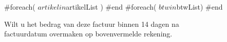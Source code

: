 \documentclass{factuur}
\begin{document}

\begin{particulierTable}[$Valuta]
	#foreach( $artikel in $artikelList )
	#end
	#foreach( $btw in $btwList)
	#end
\end{particulierTable}


\vfill
\begin{center}
	Wilt u het bedrag van deze factuur binnen 14 dagen na\\
	factuurdatum overmaken op bovenvermelde rekening.
\end{center}
\end{document}
